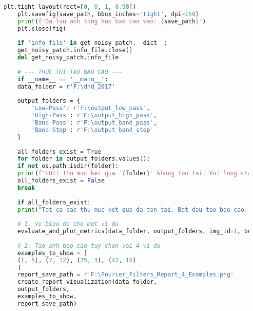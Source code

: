 \documentclass[12pt, a4paper]{article}
\begin{document}
\begin{lstlisting}[language=Python, caption={Mã nguồn tạo báo cáo tùy chọn và biểu đồ.}, label={lst:create_report}]
	plt.tight_layout(rect=[0, 0, 1, 0.98])
	plt.savefig(save_path, bbox_inches='tight', dpi=150)
	print(f"Da luu anh tong hop bao cao vao: {save_path}")
	plt.close(fig)
	
	if 'info_file' in get_noisy_patch.__dict__:
	get_noisy_patch.info_file.close()
	del get_noisy_patch.info_file
	
	# --- THUC THI TAO BAO CAO ---
	if __name__ == '__main__':
	data_folder = r'F:\dnd_2017'
	
	output_folders = {
		'Low-Pass': r'F:\output_low_pass',
		'High-Pass': r'F:\output_high_pass',
		'Band-Pass': r'F:\output_band_pass',
		'Band-Stop': r'F:\output_band_stop'
	}
	
	all_folders_exist = True
	for folder in output_folders.values():
	if not os.path.isdir(folder):
	print(f"LOI: Thu muc ket qua '{folder}' khong ton tai. Vui long chay file 'run_denoising.py' truoc.")
	all_folders_exist = False
	break
	
	if all_folders_exist:
	print("Tat ca cac thu muc ket qua da ton tai. Bat dau tao bao cao...")
	
	# 1. Ve bieu do cho mot vi du
	evaluate_and_plot_metrics(data_folder, output_folders, img_id=1, box_id=5)
	
	# 2. Tao anh bao cao tuy chon voi 4 vi du
	examples_to_show = [
	(1, 5), (7, 12), (25, 3), (42, 18)
	]
	report_save_path = r'F:\Fourier_Filters_Report_4_Examples.png'
	create_report_visualization(data_folder, 
	output_folders, 
	examples_to_show, 
	report_save_path)
\end{lstlisting}\\

	
\end{document}
